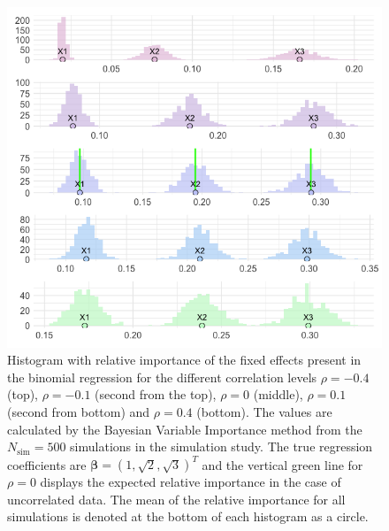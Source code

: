 \begin{figure}[H]
  \centering
  \includegraphics[width=1.1\linewidth]{Figures/Simulation study/Fixed_combined_logit_test.png}
  \caption{Histogram with relative importance of the fixed effects present in the binomial regression for the different correlation levels $\rho=-0.4$ (top), $\rho=-0.1$ (second from the top), $\rho=0$ (middle), $\rho=0.1$ (second from bottom) and $\rho=0.4$ (bottom). The values are calculated by the Bayesian Variable Importance method from the $N_{\text{sim}}=500$ simulations in the simulation study. The true regression coefficients are $\boldsymbol{\beta}=(1, \sqrt{2}, \sqrt{3})^T$ and the vertical green line for $\rho=0$ displays the expected relative importance in the case of uncorrelated data. The mean of the relative importance for all simulations is denoted at the bottom of each histogram as a circle.}
  \label{fig:fixed_combined_logit}
\end{figure}
